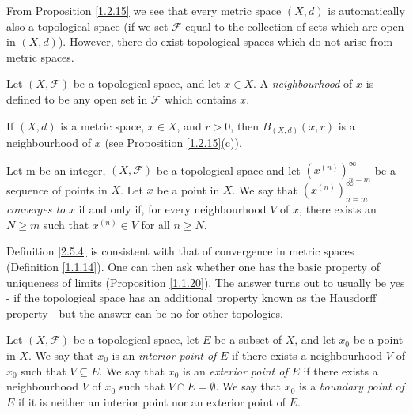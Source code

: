 \begin{note}
    From Proposition \ref{1.2.15} we see that every metric space \((X, d)\) is automatically also a topological space
    (if we set \(\mathcal{F}\) equal to the collection of sets which are open in \((X, d)\)).
    However, there do exist topological spaces which do not arise from metric spaces.
\end{note}

\begin{definition}[Neighbourhoods]\label{2.5.2}
    Let \((X, \mathcal{F})\) be a topological space, and let \(x \in X\).
    A \emph{neighbourhood} of \(x\) is defined to be any open set in \(\mathcal{F}\) which contains \(x\).
\end{definition}

\begin{example}\label{2.5.3}
    If \((X, d)\) is a metric space, \(x \in X\), and \(r > 0\), then \(B_{(X, d)}(x, r)\) is a neighbourhood of \(x\) (see Proposition \ref{1.2.15}(c)).
\end{example}

\begin{definition}\label{2.5.4}
    Let m be an integer, \((X, \mathcal{F})\) be a topological space and let \((x^{(n)})_{n = m}^\infty\) be a sequence of points in \(X\).
    Let \(x\) be a point in \(X\).
    We say that \((x^{(n)})_{n = m}^\infty\) \emph{converges to} \(x\) if and only if, for every neighbourhood \(V\) of \(x\), there exists an \(N \geq m\) such that \(x^{(n)} \in V\) for all \(n \geq N\).
\end{definition}

\begin{note}
    Definition \ref{2.5.4} is consistent with that of convergence in metric spaces (Definition \ref{1.1.14}).
    One can then ask whether one has the basic property of uniqueness of limits (Proposition \ref{1.1.20}).
    The answer turns out to usually be yes
    - if the topological space has an additional property known as the Hausdorff property
    - but the answer can be no for other topologies.
\end{note}

\begin{definition}\label{2.5.5}
    Let \((X, \mathcal{F})\) be a topological space, let \(E\) be a subset of \(X\), and let \(x_0\) be a point in \(X\).
    We say that \(x_0\) is an \emph{interior point of} \(E\) if there exists a neighbourhood \(V\) of \(x_0\) such that \(V \subseteq E\).
    We say that \(x_0\) is an \emph{exterior point of} \(E\) if there exists a neighbourhood \(V\) of \(x_0\) such that \(V \cap E = \emptyset\).
    We say that \(x_0\) is a \emph{boundary point of} \(E\) if it is neither an interior point nor an exterior point of \(E\).
\end{definition}

